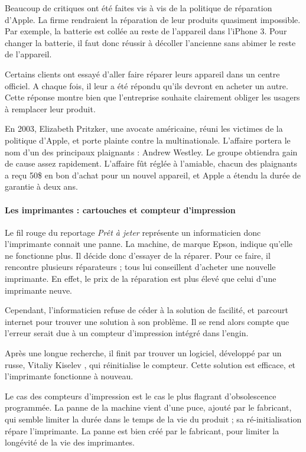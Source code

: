 \smallskip
Beaucoup de critiques ont été faites vis à vis de la politique de réparation d'Apple. La firme  rendraient la réparation de leur produits quasiment impossible. Par exemple, la batterie est collée au reste de l'appareil dans l'iPhone 3. Pour changer la batterie, il faut donc réussir à décoller l'ancienne sans abimer le reste de l'appareil.  

Certains clients ont essayé d'aller faire réparer leurs appareil dans un centre officiel. A chaque fois, il leur a été répondu qu'ils devront en acheter un autre. Cette réponse montre bien que l'entreprise souhaite clairement obliger les usagers à remplacer leur produit. 
\smallskip


En 2003, Elizabeth Pritzker, une avocate américaine, réuni les victimes de la politique d'Apple, et porte plainte contre la multinationale. L'affaire portera le nom d'un des principaux plaignants : Andrew Westley. Le groupe obtiendra gain de cause assez rapidement. L'affaire fût réglée à l'amiable, chacun des plaignants a reçu 50\$ en bon d'achat pour un nouvel appareil, et Apple a étendu la durée de garantie à deux ans. 

\paragraph*{Les imprimantes : cartouches et compteur d'impression}

Le fil rouge du reportage \textit{Prêt à jeter} représente un informaticien donc l'imprimante connait une panne. La machine, de marque Epson, indique qu'elle ne fonctionne plus. Il décide donc d'essayer de la réparer. Pour ce faire, il rencontre plusieurs réparateurs ; tous lui conseillent d'acheter une nouvelle imprimante. En effet, le prix de la réparation est plus élevé que celui d'une imprimante neuve. 

Cependant, l'informaticien refuse de céder à la solution de facilité, et parcourt internet pour trouver une solution à son problème. Il se rend alors compte que l'erreur serait due à un compteur d'impression intégré dans l'engin. 

Après une longue recherche, il finit par trouver un logiciel, développé par un russe, Vitaliy Kiselev , qui réinitialise le compteur. Cette solution est efficace, et l'imprimante fonctionne à nouveau.


Le cas des compteurs d'impression est le cas le plus flagrant d'obsolescence programmée. La panne de la machine vient d'une puce, ajouté par le fabricant, qui semble limiter la durée dans le temps de la vie du produit ; sa ré-initialisation répare l'imprimante. La panne est bien créé par le fabricant, pour limiter la longévité de la vie des imprimantes.

